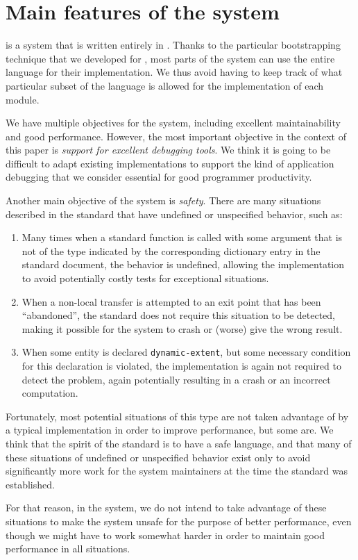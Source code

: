 \section{Main features of the \sicl{} system}
\label{sec-sicl-features}

\sicl{} is a system that is written entirely in \commonlisp{}.  Thanks
to the particular bootstrapping technique
\cite{durand_irene_2019_2634314} that we developed for \sicl{}, most
parts of the system can use the entire language for their
implementation.  We thus avoid having to keep track of what particular
subset of the language is allowed for the implementation of each
module.

We have multiple objectives for the \sicl{} system, including
excellent maintainability and good performance.  However, the most
important objective in the context of this paper is \emph{support for
  excellent debugging tools}.  We think it is going to be difficult to
adapt existing \commonlisp{} implementations to support the kind of
application debugging that we consider essential for good programmer
productivity.

Another main objective of the \sicl{} system is \emph{safety}.  There
are many situations described in the \commonlisp{} standard that have
undefined or unspecified behavior, such as:

\begin{enumerate}
\item Many times when a standard function is called with some argument
  that is not of the type indicated by the corresponding dictionary
  entry in the \commonlisp{} standard document, the behavior is
  undefined, allowing the implementation to avoid potentially costly
  tests for exceptional situations.
\item When a non-local transfer is attempted to an exit point that has
  been ``abandoned'', the standard does not require this situation to
  be detected, making it possible for the system to crash or (worse)
  give the wrong result.
\item When some entity is declared \texttt{dynamic-extent}, but some
  necessary condition for this declaration is violated, the
  implementation is again not required to detect the problem, again
  potentially resulting in a crash or an incorrect computation.
\end{enumerate}

Fortunately, most potential situations of this type are not taken
advantage of by a typical \commonlisp{} implementation in order to
improve performance, but some are.  We think that the spirit of the
\commonlisp{} standard is to have a safe language, and that many of
these situations of undefined or unspecified behavior exist only to
avoid significantly more work for the system maintainers at the time
the standard was established.

For that reason, in the \sicl{} system, we do not intend to take
advantage of these situations to make the system unsafe for the
purpose of better performance, even though we might have to work
somewhat harder in order to maintain good performance in all
situations.
